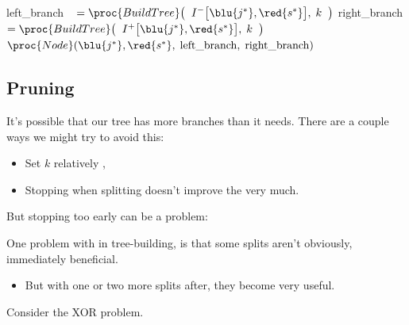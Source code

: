 \begin{codebox}
            \End
        \li
        \li{}
        \li left\_branch $\;\;\,=  \proc{BuildTree}\big( \;\; I^-\big[\blu{j^*},\red{s^*}\big], \; k \;\;\big) $
            \qquad \qquad {}
        \li right\_branch $= \proc{BuildTree}\big( \;\; I^+\big[\blu{j^*},\red{s^*}\big], \; k \;\;\big) $
            \qquad \qquad {}
        \li
        \li    \Return $\proc{Node}(\blu{j^*},\red{s^*}, \;\operatorname{left\_branch}, \;\operatorname{right\_branch})$
            \qquad \qquad {}
        \end{codebox}



    \subsection{Pruning}

        It's possible that our tree has more branches than it needs. There are a couple ways we might try to avoid this:
        
        \begin{itemize}
            \item Set $k$ relatively , 
            \item Stopping when splitting doesn't improve the  very much.
        \end{itemize}

        But stopping too early can be a problem:\\

        \begin{concept}
            One problem with  in tree-building, is that some splits aren't obviously, immediately beneficial.

            \begin{itemize}
                \item But with one or two more splits after, they become very useful.
            \end{itemize}
        \end{concept}

        Consider the XOR problem.

